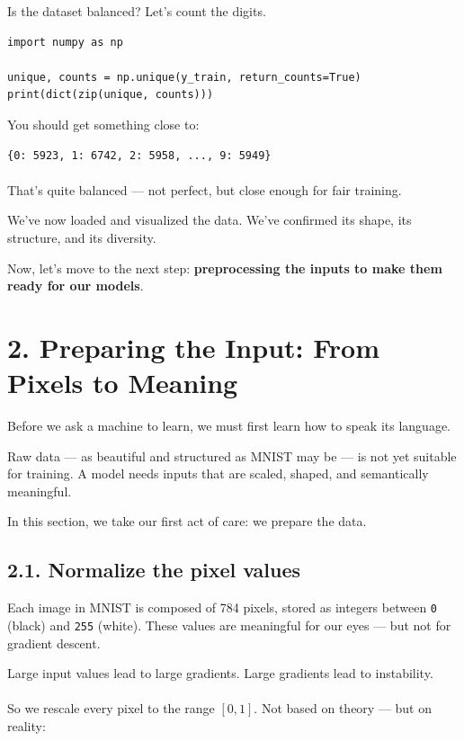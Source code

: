 \documentclass[11pt]{article}
\begin{document}
Is the dataset balanced? Let’s count the digits.

\begin{verbatim}
import numpy as np

unique, counts = np.unique(y_train, return_counts=True)
print(dict(zip(unique, counts)))
\end{verbatim}

You should get something close to:
\begin{verbatim}
{0: 5923, 1: 6742, 2: 5958, ..., 9: 5949}
\end{verbatim}

\paragraph{} That’s quite balanced — not perfect, but close enough for fair training.

\bigskip

We’ve now loaded and visualized the data. We’ve confirmed its shape, its structure, and its diversity. 

Now, let’s move to the next step: \textbf{preprocessing the inputs to make them ready for our models}.
\section*{2. Preparing the Input: From Pixels to Meaning}

Before we ask a machine to learn, we must first learn how to speak its language.

Raw data — as beautiful and structured as MNIST may be — is not yet suitable for training. A model needs inputs that are scaled, shaped, and semantically meaningful.

In this section, we take our first act of care: we prepare the data.

\subsection*{2.1. Normalize the pixel values}

Each image in MNIST is composed of 784 pixels, stored as integers between \texttt{0} (black) and \texttt{255} (white). These values are meaningful for our eyes — but not for gradient descent.

Large input values lead to large gradients. Large gradients lead to instability.

\paragraph{} So we rescale every pixel to the range $[0, 1]$. Not based on theory — but on reality:
\end{document}
